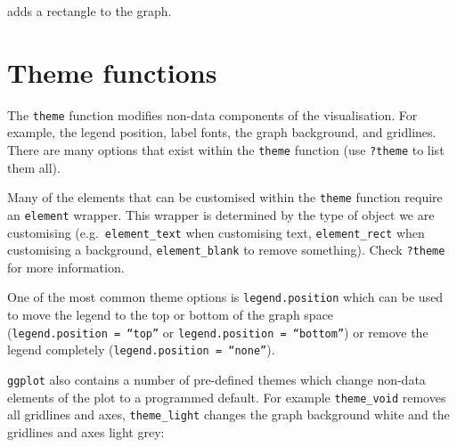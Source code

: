 \documentclass[
  letterpaper,
  DIV=11,
  numbers=noendperiod]{scrreprt}
\begin{document}
adds a rectangle to the graph.

\section{Theme functions}\label{theme-functions}

The \texttt{theme} function modifies non-data components of the
visualisation. For example, the legend position, label fonts, the graph
background, and gridlines. There are many options that exist within the
\texttt{theme} function (use \texttt{?theme} to list them all).

\begin{tcolorbox}[enhanced jigsaw, bottomrule=.15mm, left=2mm, leftrule=.75mm, bottomtitle=1mm, coltitle=black, colbacktitle=quarto-callout-note-color!10!white, toptitle=1mm, arc=.35mm, breakable, title=\textcolor{quarto-callout-note-color}{\faInfo}\hspace{0.5em}{Note}, rightrule=.15mm, toprule=.15mm, opacityback=0, opacitybacktitle=0.6, titlerule=0mm, colback=white, colframe=quarto-callout-note-color-frame]

Many of the elements that can be customised within the \texttt{theme}
function require an \texttt{element} wrapper. This wrapper is determined
by the type of object we are customising (e.g.~\texttt{element\_text}
when customising text, \texttt{element\_rect} when customising a
background, \texttt{element\_blank} to remove something). Check
\texttt{?theme} for more information.

\end{tcolorbox}

One of the most common theme options is \texttt{legend.position} which
can be used to move the legend to the top or bottom of the graph space
(\texttt{legend.position\ =\ “top”} or
\texttt{legend.position\ =\ “bottom”}) or remove the legend completely
(\texttt{legend.position\ =\ “none”}).

\texttt{ggplot} also contains a number of pre-defined themes which
change non-data elements of the plot to a programmed default. For
example \texttt{theme\_void} removes all gridlines and axes,
\texttt{theme\_light} changes the graph background white and the
gridlines and axes light grey:
\end{document}
